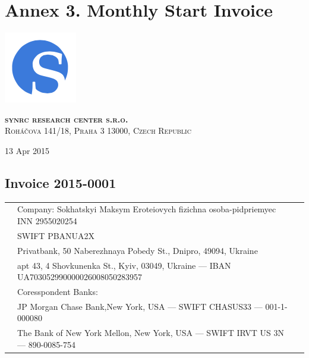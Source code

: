 \documentclass[11pt,oneside]{article}
\begin{document}
\section*{{\bf Annex 3. Monthly Start Invoice}}

\begin{minipage}[t]{2cm}
\includegraphics[scale=0.4]{S}
\end{minipage}
\begin{minipage}[t]{12cm}
\begin{flushright}
\textsc{{\Large {\bf {\color{Blue}syn}{\color{OrangeRed}rc} research center s.r.o.}}}\\
\textsc{Roháčova 141/18, Praha 3 13000, Czech Republic}\\
\end{flushright}
\end{minipage}

\vspace{2\baselineskip}
13 Apr 2015
\vspace{5\baselineskip}
\begin{center}\subsection*{Invoice 2015-0001}\end{center}
\vspace{3\baselineskip}
\begin{tabular}{lll}
        & Company: Sokhatskyi Maksym Eroteiovych fizichna osoba-pidpriemyec INN 2955020254 \\
        & SWIFT PBANUA2X \\
        & Privatbank, 50 Naberezhnaya Pobedy St., Dnipro, 49094, Ukraine \\
        & apt 43, 4 Shovkunenka St., Kyiv, 03049, Ukraine --- IBAN UA703052990000026008050283957 \\
        & Coresspondent Banks: \\
        & JP Morgan Chase Bank,New York, USA --- SWIFT CHASUS33 --- 001-1-000080 \\
        & The Bank of New York Mellon, New York, USA --- SWIFT IRVT US 3N --- 890-0085-754 \\
\end{tabular}
\end{document}
